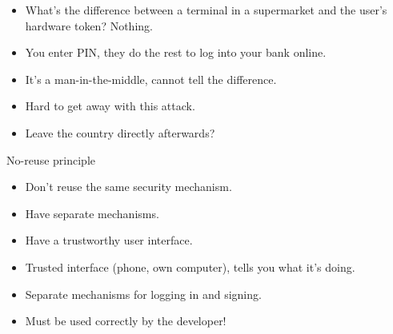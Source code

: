 \begin{frame}
  \begin{remark}
    \begin{itemize}
      \item What's the difference between a terminal in a supermarket and the 
        user's hardware token? Nothing.
      \item You enter PIN, they do the rest to log into your bank online.
      \item It's a man-in-the-middle, cannot tell the difference.
    \end{itemize}
  \end{remark}

  \pause

  \begin{remark}
    \begin{itemize}
      \item Hard to get away with this attack.
      \item Leave the country directly afterwards?
    \end{itemize}
  \end{remark}
\end{frame}

\begin{frame}
  \begin{block}{No-reuse principle}
    \begin{itemize}
      \item Don't reuse the same security mechanism.
      \item Have separate mechanisms.
      \item Have a trustworthy user interface.
    \end{itemize}
  \end{block}
\end{frame}

\begin{frame}
  \begin{example}[BankID]
    \begin{itemize}
      \item Trusted interface (phone, own computer), tells you what it's doing.
      \item Separate mechanisms for logging in and signing.
    \end{itemize}
  \end{example}

  \pause

  \begin{remark}
    \begin{itemize}
      \item Must be used correctly by the developer!
    \end{itemize}
  \end{remark}
\end{frame}




\begin{frame}
	\small
  \printbibliography
\end{frame}

